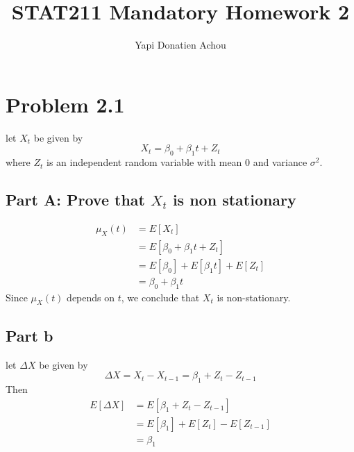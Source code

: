 \documentclass[11pt, oneside]{article}   	%
\title{STAT211 Mandatory Homework 2}
\author{Yapi Donatien Achou}
\begin{document}
\maketitle

\section{Problem 2.1}
let  $X_{t}$ be given by 
\begin{equation}
X_{t} = \beta_{0} + \beta_{1}t + Z_{t}
\end{equation}
where $Z_{t}$ is an independent random variable with mean 0 and variance $\sigma^{2}$.
\subsection{Part A: Prove that $X_{t}$ is non stationary}
\begin{equation}
\begin{aligned}
\mu_{X}(t)  &= E[X_{t}]\\
&=E[\beta_{0} + \beta_{1}t + Z_{t}]\\
&=E[\beta_{0}] + E[\beta_{1}t] + E[Z_{t}]\\
&=\beta_{0} + \beta_{1}t
\end{aligned}
\end{equation}
Since $\mu_{X}(t) $ depends on $t$, we conclude that $X_{t}$ is non-stationary.

\subsection{Part b}
let $\Delta X$ be given by 
\begin{equation}
\Delta X = X_{t} - X_{t-1} = \beta_{1} + Z_{t} - Z_{t-1}
\end{equation}
Then 
\begin{equation}
\begin{aligned}
E[\Delta X] &= E[\beta_{1} + Z_{t} - Z_{t-1}]\\
&=E[\beta_{1}]+E[Z_{t}] -E[Z_{t-1}] \\
&=\beta_{1}
\end{aligned}
\end{equation}
\end{document}
